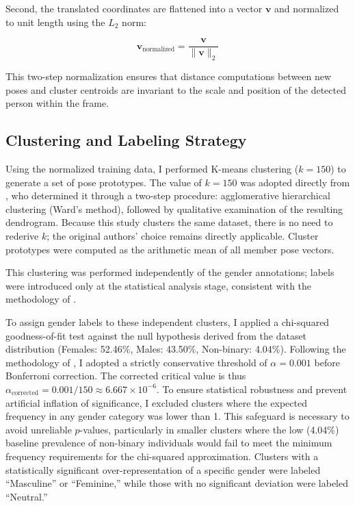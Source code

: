 \documentclass[12pt, a4paper]{article}
\begin{document}
Second, the translated coordinates are flattened into a vector $\mathbf{v}$ and normalized to unit length using the $L_2$ norm:

\begin{equation}
    \mathbf{v}_{\text{normalized}} = \frac{\mathbf{v}}{\|\mathbf{v}\|_2}
    \label{eq:normalization}
\end{equation}

\noindent This two-step normalization ensures that distance computations between new poses and cluster centroids are invariant to the scale and position of the detected person within the frame.


\subsection{Clustering and Labeling Strategy}
\label{sec:clustering}

Using the normalized training data, I performed K-means clustering ($k = 150$) to generate a set of pose prototypes. The value of $k = 150$ was adopted directly from \citet{tsolak2025unveiling}, who determined it through a two-step procedure: agglomerative hierarchical clustering (Ward's method), followed by qualitative examination of the resulting dendrogram. Because this study clusters the same dataset, there is no need to rederive $k$; the original authors' choice remains directly applicable. Cluster prototypes were computed as the arithmetic mean of all member pose vectors.

\noindent This clustering was performed independently of the gender annotations; labels were introduced only at the statistical analysis stage, consistent with the methodology of \citet{tsolak2025unveiling}.

To assign gender labels to these independent clusters, I applied a chi-squared goodness-of-fit test against the null hypothesis derived from the dataset distribution (Females: 52.46\%, Males: 43.50\%, Non-binary: 4.04\%). Following the methodology of \citet{tsolak2025unveiling}, I adopted a strictly conservative threshold of $\alpha = 0.001$ before Bonferroni correction. The corrected critical value is thus $\alpha_{\text{corrected}} = 0.001 / 150 \approx 6.667 \times 10^{-6}$. To ensure statistical robustness and prevent artificial inflation of significance, I excluded clusters where the expected frequency in any gender category was lower than 1. This safeguard is necessary to avoid unreliable $p$-values, particularly in smaller clusters where the low (4.04\%) baseline prevalence of non-binary individuals would fail to meet the minimum frequency requirements for the chi-squared approximation. Clusters with a statistically significant over-representation of a specific gender were labeled ``Masculine'' or ``Feminine,'' while those with no significant deviation were labeled ``Neutral.''
\end{document}
